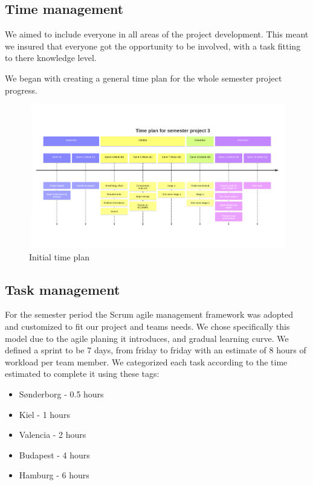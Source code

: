 \documentclass[../report.tex]{subfiles}
\begin{document}
\subsection{Time management}
We aimed to include everyone in all areas of the project development. This meant
we insured that everyone got the opportunity to be involved, with a task
fitting to there knowledge level.

We began with creating a general time plan for the whole semester project
progress.
\begin{figure}[H]
    \includegraphics[width=\textwidth]{Management/timeplan.png}
    \caption{Initial time plan}
\end{figure}

\subsection{Task management}

For the semester period the Scrum agile management framework was adopted and customized to fit our project
and teams needs. We chose specifically this model due to the agile planing it introduces, and gradual
learning curve. We defined a sprint to be 7 days, from friday to friday with an estimate of 8 hours of
workload per team member. We categorized each task according to the time estimated to complete it
using these tags:

\begin{itemize}
    \item Sønderborg - 0.5 hours
    \item Kiel - 1 hours
    \item Valencia - 2 hours
    \item Budapest - 4 hours
    \item Hamburg -  6 hours
\end{itemize}
\end{document}
